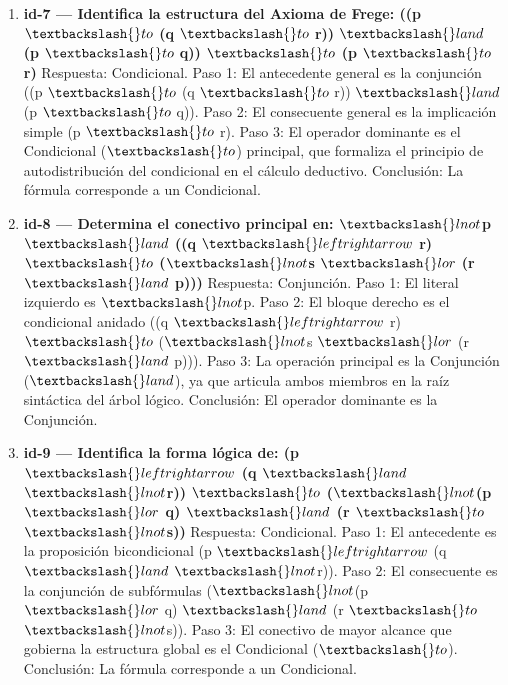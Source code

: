 \documentclass[11pt,a4paper,openany]{book}
\begin{document}
\begin{enumerate}[leftmargin=*]
\item \textbf{id-7 --- Identifica la estructura del Axioma de Frege: ((p $ \textbackslash\{\}to $ (q $ \textbackslash\{\}to $ r)) $ \textbackslash\{\}land $ (p $ \textbackslash\{\}to $ q)) $ \textbackslash\{\}to $ (p $ \textbackslash\{\}to $ r)} Respuesta: Condicional. Paso 1: El antecedente general es la conjunción ((p $ \textbackslash\{\}to $ (q $ \textbackslash\{\}to $ r)) $ \textbackslash\{\}land $ (p $ \textbackslash\{\}to $ q)). Paso 2: El consecuente general es la implicación simple (p $ \textbackslash\{\}to $ r). Paso 3: El operador dominante es el Condicional ($ \textbackslash\{\}to $) principal, que formaliza el principio de autodistribución del condicional en el cálculo deductivo. Conclusión: La fórmula corresponde a un Condicional.

\item \textbf{id-8 --- Determina el conectivo principal en: $ \textbackslash\{\}lnot $p $ \textbackslash\{\}land $ ((q $ \textbackslash\{\}leftrightarrow $ r) $ \textbackslash\{\}to $ ($ \textbackslash\{\}lnot $s $ \textbackslash\{\}lor $ (r $ \textbackslash\{\}land $ p)))} Respuesta: Conjunción. Paso 1: El literal izquierdo es $ \textbackslash\{\}lnot $p. Paso 2: El bloque derecho es el condicional anidado ((q $ \textbackslash\{\}leftrightarrow $ r) $ \textbackslash\{\}to $ ($ \textbackslash\{\}lnot $s $ \textbackslash\{\}lor $ (r $ \textbackslash\{\}land $ p))). Paso 3: La operación principal es la Conjunción ($ \textbackslash\{\}land $), ya que articula ambos miembros en la raíz sintáctica del árbol lógico. Conclusión: El operador dominante es la Conjunción.

\item \textbf{id-9 --- Identifica la forma lógica de: (p $ \textbackslash\{\}leftrightarrow $ (q $ \textbackslash\{\}land $ $ \textbackslash\{\}lnot $r)) $ \textbackslash\{\}to $ ($ \textbackslash\{\}lnot $(p $ \textbackslash\{\}lor $ q) $ \textbackslash\{\}land $ (r $ \textbackslash\{\}to $ $ \textbackslash\{\}lnot $s))} Respuesta: Condicional. Paso 1: El antecedente es la proposición bicondicional (p $ \textbackslash\{\}leftrightarrow $ (q $ \textbackslash\{\}land $ $ \textbackslash\{\}lnot $r)). Paso 2: El consecuente es la conjunción de subfórmulas ($ \textbackslash\{\}lnot $(p $ \textbackslash\{\}lor $ q) $ \textbackslash\{\}land $ (r $ \textbackslash\{\}to $ $ \textbackslash\{\}lnot $s)). Paso 3: El conectivo de mayor alcance que gobierna la estructura global es el Condicional ($ \textbackslash\{\}to $). Conclusión: La fórmula corresponde a un Condicional.


\end{enumerate}
\end{document}
